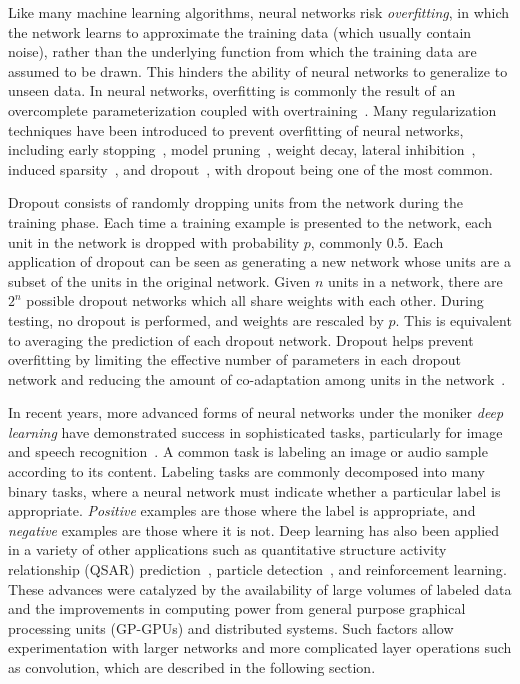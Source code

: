 Like many machine learning algorithms, neural networks risk \textit{overfitting}, in which the network learns to approximate the training data (which usually contain noise), rather than the underlying function from which the training data are assumed to be drawn.
This hinders the ability of neural networks to generalize to unseen data.
In neural networks, overfitting is commonly the result of an overcomplete parameterization coupled with overtraining~\cite{reed1993, dalianis1993}.
Many regularization techniques have been introduced to prevent overfitting of neural networks, including early stopping~\cite{morgan1990}, model pruning~\cite{reed1993}, weight decay\cite{krogh1992}, lateral inhibition~\cite{krizhevsky2012}, induced sparsity~\cite{ng2011, makhzani2015}, and dropout~\cite{srivastava2014}, with dropout being one of the most common. 

Dropout consists of randomly dropping units from the network during the training phase.
Each time a training example is presented to the network, each unit in the network is dropped with probability $p$, commonly 0.5.
Each application of dropout can be seen as generating a new network whose units are a subset of the units in the original network.
Given $n$ units in a network, there are $2^n$ possible dropout networks which all share weights with each other.
During testing, no dropout is performed, and weights are rescaled by $p$.
This is equivalent to averaging the prediction of each dropout network.
Dropout helps prevent overfitting by limiting the effective number of parameters in each dropout network and reducing the amount of co-adaptation among units in the network~\cite{srivastava2014}.


In recent years, more advanced forms of neural networks under the moniker \textit{deep learning} have demonstrated success in sophisticated tasks, particularly for image and speech recognition~\cite{krizhevsky2012, lecun2015, masci2011, hinton2012, he2016}.
A common task is labeling an image or audio sample according to its content.
Labeling tasks are commonly decomposed into many binary tasks, where a neural network must indicate whether a particular label is appropriate.
\textit{Positive} examples are those where the label is appropriate, and \textit{negative} examples are those where it is not.
Deep learning has also been applied in a variety of other applications such as quantitative structure activity relationship (QSAR) prediction~\cite{ma2015}, particle detection~\cite{ciodaro2012}, and reinforcement learning\cite{mnih2015}.
These advances were catalyzed by the availability of large volumes of labeled data\cite{deng2009, krizhevsky2009} and the improvements in computing power from general purpose graphical processing units (GP-GPUs) and distributed systems\cite{chetlur2014, chu2007}.
Such factors allow experimentation with larger networks and more complicated layer operations such as convolution, which are described in the following section.

